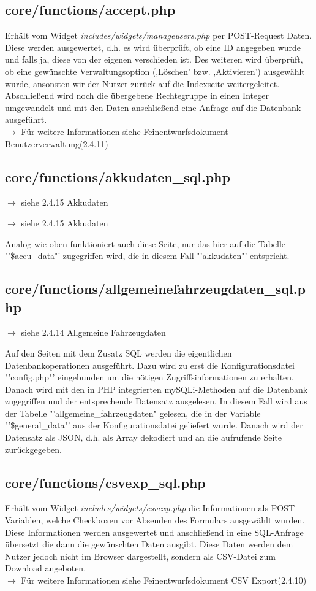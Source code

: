 \documentclass[fontsize = 12pt, paper = a4]{scrreprt}
\begin{document}
\subsection{core/functions/accept.php}
Erhält vom Widget \textit{includes/widgets/manageusers.php} per POST-Request Daten. Diese werden ausgewertet, d.h. es wird überprüft, ob eine ID angegeben wurde und falls ja, diese von der eigenen verschieden ist. Des weiteren wird überprüft, ob eine gewünschte Verwaltungsoption (,Löschen' bzw. ,Aktivieren') ausgewählt wurde, ansonsten wir der Nutzer zurück auf die Indexseite weitergeleitet. Abschließend wird noch die übergebene Rechtegruppe in einen Integer umgewandelt und mit den Daten anschließend eine Anfrage auf die Datenbank ausgeführt.\\
$\rightarrow$ Für weitere Informationen siehe Feinentwurfsdokument \glqq Benutzerverwaltung\grqq (2.4.11)

\subsection{core/functions/akkudaten\_sql.php}
$\rightarrow$ siehe 2.4.15 Akkudaten

$\rightarrow$ siehe 2.4.15 Akkudaten

Analog wie oben funktioniert auch diese Seite, nur das hier auf die Tabelle "'\$accu\_data"' zugegriffen wird, die in diesem Fall "'akkudaten"' entspricht.\\


\subsection{core/functions/allgemeinefahrzeugdaten\_sql.php}
$\rightarrow$ siehe 2.4.14 Allgemeine Fahrzeugdaten

Auf den Seiten mit dem Zusatz SQL werden die eigentlichen Datenbankoperationen ausgeführt. Dazu wird zu erst die Konfigurationsdatei "'config.php"' eingebunden um die nötigen Zugriffsinformationen zu erhalten. Danach wird mit den in PHP integrierten mySQLi-Methoden auf die Datenbank zugegriffen und der entsprechende Datensatz ausgelesen. In diesem Fall wird aus der Tabelle "'allgemeine\_fahrzeugdaten" gelesen, die in der Variable "'\$general\_data"' aus der Konfigurationsdatei geliefert wurde. Danach wird der Datensatz als JSON, d.h. als Array dekodiert und an die aufrufende Seite zurückgegeben. 

\subsection{core/functions/csvexp\_sql.php}
Erhält vom Widget \textit{includes/widgets/csvexp.php} die Informationen als POST-Variablen, welche Checkboxen vor Absenden des Formulars ausgewählt wurden. Diese Informationen werden ausgewertet und anschließend in eine SQL-Anfrage übersetzt die dann die gewünschten Daten ausgibt. Diese Daten werden dem Nutzer jedoch nicht im Browser dargestellt, sondern als CSV-Datei zum Download angeboten.\\
$\rightarrow$ Für weitere Informationen siehe Feinentwurfsdokument \glqq CSV Export\grqq (2.4.10)
\end{document}
